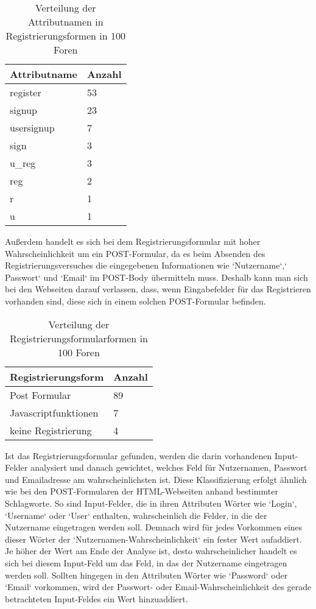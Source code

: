\begin{table}[h!]
\centering 
\begin{tabular}{ | p{3cm} | p{3cm}|} \hline
\textbf{Attributname} & \textbf{Anzahl} \\ \hline
register & 53 \\ \hline
signup & 23 \\ \hline
usersignup & 7 \\ \hline
sign & 3 \\ \hline
u\_reg & 3 \\ \hline
reg & 2 \\ \hline
r & 1 \\ \hline
u & 1 \\ \hline
\end{tabular}
\caption{Verteilung der Attributnamen in Registrierungsformen in 100 Foren}
\end{table}



Außerdem handelt es sich bei dem Registrierungsformular mit hoher Wahrscheinlichkeit um ein POST-Formular, da es beim Absenden des Registrierungsversuches die eingegebenen Informationen wie `Nutzername`,` Passwort` und `Email` im POST-Body übermitteln muss.
Deshalb kann man sich bei den Webseiten darauf verlassen, dass, wenn Eingabefelder für das Registrieren vorhanden sind, diese sich in einem solchen POST-Formular befinden.

\begin{table}[h!]
\centering 
\begin{tabular}{ | p{5cm} | p{3cm}|} \hline
\textbf{Registrierungsform} & \textbf{Anzahl} \\ \hline
Post Formular & 89 \\ \hline
Javascriptfunktionen & 7 \\ \hline
keine Registrierung & 4 \\ \hline
\end{tabular}
\caption{Verteilung der Registrierungsformularformen in 100 Foren}
\end{table}


Ist das Registrierungsformular gefunden, werden die darin vorhandenen Input-Felder analysiert und danach gewichtet, welches Feld für Nutzernamen, Passwort und Emailadresse am wahrscheinlichsten ist.
Diese Klassifizierung erfolgt ähnlich wie bei den POST-Formularen der HTML-Webseiten anhand bestimmter Schlagworte.
So sind Input-Felder, die in ihren Attributen Wörter wie `Login`, `Username` oder `User` enthalten, wahrscheinlich die Felder, in die der Nutzername eingetragen werden soll. Demnach wird für jedes Vorkommen eines dieser Wörter der `Nutzernamen-Wahrscheinlichkeit` ein fester Wert aufaddiert. Je höher der Wert am Ende der Analyse ist, desto wahrscheinlicher handelt es sich bei diesem Input-Feld um das Feld, in das der Nutzername eingetragen werden soll. Sollten hingegen in den Attributen Wörter wie `Password` oder `Email` vorkommen, wird der Passwort- oder Email-Wahrscheinlichkeit des gerade betrachteten Input-Feldes ein Wert hinzuaddiert.

